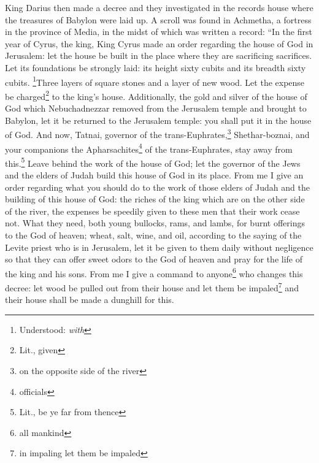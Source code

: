 
\begin{enumerate*}[mode=unboxed]
     King Darius then made a decree and they investigated in the records house where the treasures of Babylon were laid up.%
     A scroll was found in Achmetha, a fortress in the province of Media, in the midst of which was written a record:%
     ``In the first year of Cyrus, the king, King Cyrus made an order regarding the house of God in Jerusalem: let the house be built in the place where they are sacrificing sacrifices. Let its foundations be strongly laid: its height sixty cubits and its breadth sixty cubits.%
     \footnote{Understood: \textit{with}}Three layers of square stones and a layer of new wood. Let the expense be charged\footnote{Lit., given} to the king's house.%
     Additionally, the gold and silver of the house of God which Nebuchadnezzar removed from the Jerusalem temple and brought to Babylon, let it be returned to the Jerusalem temple: you shall put it in the house of God.%
     And now, Tatnai, governor of the trans-Euphrates,\footnote{on the opposite side of the river} Shethar-boznai, and your companions the Apharsachites\footnote{officials} of the trans-Euphrates, stay away from this.\footnote{Lit., be ye far from thence}%
     Leave behind the work of the house of God; let the governor of the Jews and the elders of Judah build this house of God in its place.%
     From me I give an order regarding what you should do to the work of those elders of Judah and the building of this house of God: the riches of the king which are on the other side of the river, the expenses be speedily given to these men that their work cease not.%
     What they need, both young bullocks, rams, and lambs, for burnt offerings to the God of heaven; wheat, salt, wine, and oil, according to the saying of the Levite priest who is in Jerusalem, let it be given to them daily without negligence%
     so that they can offer sweet odors to the God of heaven and pray for the life of the king and his sons.%
     From me I give a command to anyone\footnote{all mankind} who changes this decree: let wood be pulled out from their house and let them be impaled\footnote{in impaling let them be impaled} and their house shall be made a dunghill for this.%

\end{enumerate*}
